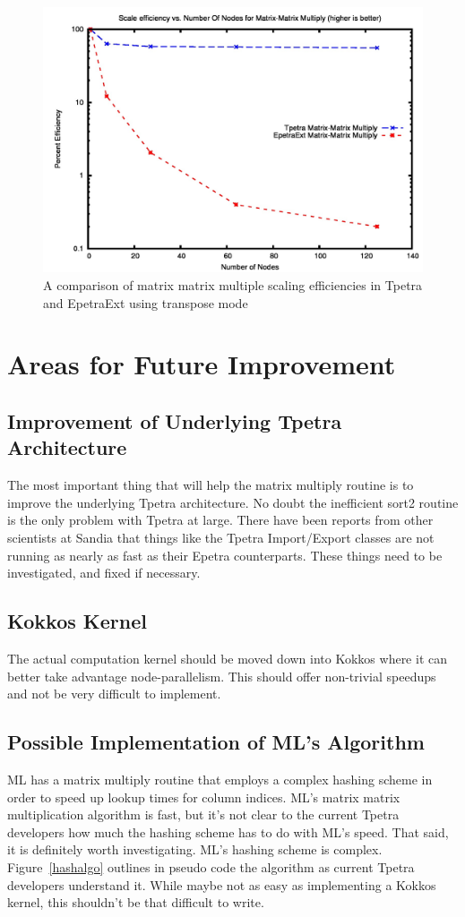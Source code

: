 \documentclass{article}
\begin{document}
\begin{figure}
\includegraphics[scale=.4]{atranseff.jpg}
\caption[Efficiency Comparison]{A comparison of matrix matrix multiple scaling efficiencies in Tpetra and EpetraExt using transpose mode}
\label{transeff}
\end{figure}

\section{Areas for Future Improvement}
\subsection{Improvement of Underlying Tpetra Architecture}
The most important thing that will help the matrix multiply routine is to improve the underlying Tpetra architecture. 
No doubt the inefficient sort2 routine is the only problem with Tpetra at large. There have been reports from other 
scientists at Sandia that things like the Tpetra Import/Export classes are not running as nearly as fast as their Epetra 
counterparts. These things need to be investigated, and fixed if necessary.

\subsection{Kokkos Kernel}
The actual computation kernel should be moved down into Kokkos where it can better take advantage node-parallelism. 
This should offer non-trivial speedups and not be very difficult to implement.

\subsection{Possible Implementation of ML's Algorithm}
ML has a matrix multiply routine that employs a complex hashing scheme in order to speed up lookup times for 
column indices. ML's matrix matrix multiplication algorithm is fast, but it's not clear to the current Tpetra developers 
how much the hashing scheme has to do with ML's speed. That said, it is definitely worth investigating. ML's hashing scheme 
is complex. Figure~\ref{hashalgo} outlines in pseudo code the algorithm as current Tpetra developers 
understand it. While maybe not as easy as implementing a Kokkos kernel, this shouldn't be that difficult to write.
\end{document}
